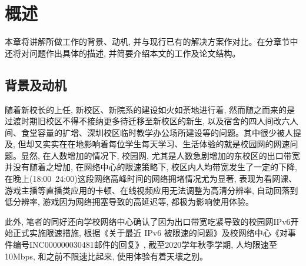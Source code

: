 
\chapter{概述}
\label{cha:introduction}

本章将讲解所做工作的背景、动机, 并与现行已有的解决方案作对比。在分章节中还将对问题作出具体的描述, 并简要介绍本文的工作及论文结构。

\section{背景及动机}
\label{sec:background}
随着新校长的上任, 新校区、新院系的建设如火如荼地进行着, 然而随之而来的是过渡时期旧校区不得不接纳更多待迁移至新校区的新生, 以及宿舍的四人间改六人间、食堂容量的扩增、深圳校区临时教学办公场所建设等的问题。其中很少被人提及, 但却又实实在在地影响着每位学生每天学习、生活体验的就是校园网的网速问题。显然, 在人数增加的情况下, 校园网, 尤其是人数急剧增加的东校区的出口带宽并没有随着之增加, 在网络中心的限速策略下, 校区内人均带宽发生了一定的下降, 在晚上(18:00~24:00)这段网络高峰时间的网络拥堵情况尤为显著, 表现为看网课、游戏主播等直播类应用的卡顿、在线视频应用无法调整为高清分辨率, 自动回落到低分辨率, 游戏因为网络拥塞导致的高延迟等, 都极为影响使用体验。

此外, 笔者的同好还向学校网络中心确认了因为出口带宽吃紧导致的校园网IPv6开始正式实施限速措施, 根据《关于最近 IPv6 被限速的问题》\cite{jipeng2019askratelimit}及校网络中心《对事件编号INC000000030481邮件的回复》\cite{sysuhelpdesk2019answerratelimit}, 截至2020学年秋季学期, 人均限速至10Mbps, 和之前不限速比起来, 使用体验有着天壤之别。

